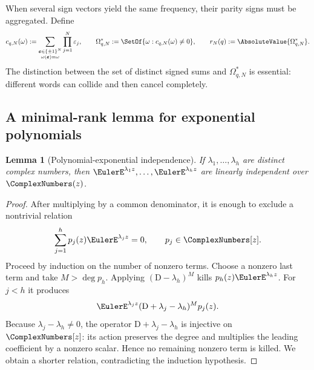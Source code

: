 \documentclass[11pt]{article}
\numberwithin{equation}{section}
\newtheorem{lemma}[theorem]{Lemma}
\theoremstyle{definition}
\theoremstyle{remark}
\newcommand{\D}{\mathrm D}
\newcommand{\eps}{\varepsilon}
\begin{document}
When several sign vectors yield the same frequency, their parity signs must be
aggregated.  Define
\begin{equation}
 c_{q,N}(\omega):=
 \sum_{\substack{\bm\eps\in\{\pm1\}^N\\
                   \omega(\bm\eps)=\omega}}
 \prod_{j=1}^{N}\eps_j,
 \qquad
 \Omega^*_{q,N}:=\SetOf{\omega:c_{q,N}(\omega)\ne0},
 \qquad r_N(q):=\AbsoluteValue{\Omega^*_{q,N}}.
 \label{eq:aggregated-support}
\end{equation}
The distinction between the set of distinct signed sums and $\Omega^*_{q,N}$
is essential: different words can collide and then cancel completely.

\subsection{A minimal-rank lemma for exponential polynomials}

\begin{lemma}[Polynomial-exponential independence]
\label{lem:exp-independence}
If $\lambda_1,\ldots,\lambda_h$ are distinct complex numbers, then
$\EulerE^{\lambda_1z},\ldots,\EulerE^{\lambda_hz}$ are linearly independent over
$\ComplexNumbers(z)$.
\end{lemma}
\begin{proof}
After multiplying by a common denominator, it is enough to exclude a nontrivial
relation
\begin{equation}
 \sum_{j=1}^{h}p_j(z)\EulerE^{\lambda_jz}=0,
 \qquad p_j\in\ComplexNumbers[z].
 \label{eq:polyexp-relation}
\end{equation}
Proceed by induction on the number of nonzero terms.  Choose a nonzero last
term and take $M>\deg p_h$.  Applying $(\D-\lambda_h)^M$ kills
$p_h(z)\EulerE^{\lambda_hz}$.  For $j<h$ it produces
\[
 \EulerE^{\lambda_jz}(\D+\lambda_j-\lambda_h)^Mp_j(z).
\]
Because $\lambda_j-\lambda_h\ne0$, the operator
$\D+\lambda_j-\lambda_h$ is injective on $\ComplexNumbers[z]$: its action preserves the
degree and multiplies the leading coefficient by a nonzero scalar.  Hence no
remaining nonzero term is killed.  We obtain a shorter relation, contradicting
the induction hypothesis.
\end{proof}
\end{document}
